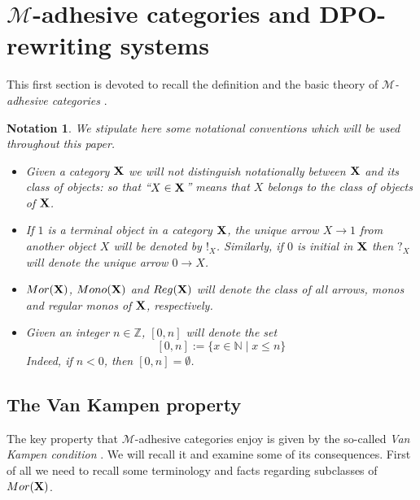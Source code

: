 \documentclass[a4paper,UKenglish,cleveref,pdftex, thm-restate,numberwithinsect]{lipics}
\newcommand{\mor}{\mathsf{Mor}}
\newcommand{\mon}{\mathsf{Mono}}
\newcommand{\reg}{\mathsf{Reg}}
\def\X{\textbf {\textup{X}}}
\def\Set{\textbf {\textup{Set}}}
\newtheorem*{notation}{Notation}
\begin{document}



\section{$\mathcal{M}$-adhesive categories and DPO-rewriting systems}\label{sec:ade}

This first section is devoted to recall the definition and the basic theory of \emph{$\mathcal{M}$-adhesive categories} \cite{azzi2019essence,ehrig2012,ehrig2014adhesive,lack2005adhesive}. 

\begin{notation} 
We stipulate here some notational conventions which will be used throughout this paper. 
\begin{itemize}\item 
	Given a category $\X$ we will not distinguish notationally between $\X$ and its class of objects: so that ``$X\in \X$'' means that $X$ belongs to the class of objects of $\X$.  
	\item 
	If $1$ is a terminal object in a category $\X$,  the unique arrow $X\to 1$ from another object $X$ will be denoted by $!_X$. Similarly, if $0$ is initial in $\X$ then $?_X$ will denote the unique arrow $0\to X$. %
	\item  $\mor(\X)$, $\mon(\X)$ and $\reg(\X)$ will denote the class of all arrows, monos and regular monos of $\X$, respectively.
	
	\item Given an integer $n\in \mathbb{Z}$, $[0,n]$ will denote the set
	\[[0,n]:=\{x\in \mathbb{N}\mid x\leq n\}\]
	Indeed, if $n<0$, then $[0,n]=\emptyset$.
\end{itemize}
\end{notation}


\subsection{The Van Kampen property}
The key property that $\mathcal{M}$-adhesive categories enjoy is given by  the so-called \emph{Van Kampen condition} \cite{brown1997van,johnstone2007quasitoposes,lack2005adhesive}. We will recall it and examine some of its consequences. First of all we need to recall some terminology and facts regarding subclasses of $\mor(\X)$.
\end{document}

